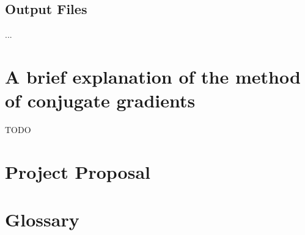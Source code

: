\documentclass[12pt,twoside,notitlepage]{report}
\begin{document}
    \section{Output Files}
        ...










\cleardoublepage
\chapter{A brief explanation of the method of conjugate gradients}
    TODO












\cleardoublepage
\chapter{Project Proposal}













\cleardoublepage
\chapter{Glossary}
\glsaddall
\printglossaries
\end{document}
